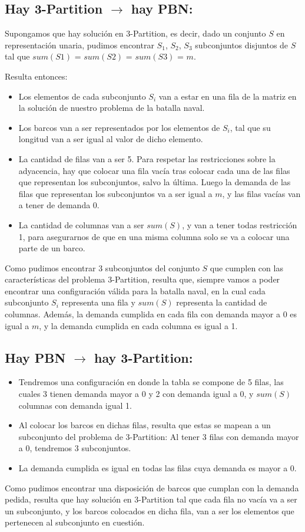 \subsection{Hay 3-Partition $\rightarrow$ hay PBN:}

Supongamos que hay solución en 3-Partition, es decir, dado un conjunto $S$ en representación unaria, pudimos
encontrar $S_1$, $S_2$, $S_3$ subconjuntos disjuntos de $S$ tal que $sum(S1)$ = $sum(S2)$ = $sum(S3)$ = $m$.

Resulta entonces: 

\begin{itemize}
    \item Los elementos de cada subconjunto $S_i$ van a estar en una fila de la matriz en la solución de nuestro problema de la batalla naval.
    \item Los barcos van a ser representados por los elementos de $S_i$, tal que su longitud van a ser igual al valor de dicho elemento.
    \item La cantidad de filas van a ser 5. Para respetar las restricciones sobre la adyacencia, hay que colocar una fila vacía tras colocar cada una de las filas que representan los subconjuntos, salvo la última. Luego la demanda de las filas que representan los subconjuntos va a ser igual a $m$, y las filas vacías van a tener de demanda 0.
    \item La cantidad de columnas van a ser $sum(S)$, y van a tener todas restricción 1, para asegurarnos de que en una misma columna solo se va a colocar una parte de un barco.
\end{itemize}
Como pudimos encontrar 3 subconjuntos del conjunto $S$ que cumplen con las características del problema 3-Partition, resulta que, siempre vamos a poder encontrar una configuración válida para la batalla naval, en la cual cada subconjunto $S_i$ representa una fila y $sum(S)$ representa la cantidad de columnas. Además, la demanda cumplida en cada fila con demanda mayor a 0 es igual a $m$, y la demanda cumplida en cada columna es igual a 1.
    
\subsection{Hay PBN $\rightarrow$ hay 3-Partition:}

\begin{itemize}
    \item Tendremos una configuración en donde la tabla se compone de 5 filas, las cuales 3 tienen demanda mayor a 0 y 2 con demanda igual a 0, y $sum(S)$ columnas con demanda igual 1.
    \item Al colocar los barcos en dichas filas, resulta que estas se mapean a un subconjunto del problema de 3-Partition: Al tener 3 filas con demanda mayor a 0, tendremos 3 subconjuntos.
    \item La demanda cumplida es igual en todas las filas cuya demanda es mayor a 0.
\end{itemize}
Como pudimos encontrar una disposición de barcos que cumplan con la demanda pedida, resulta que hay solución en 3-Partition tal que cada fila no vacía va a ser un subconjunto, y los barcos colocados en dicha fila, van a ser los elementos que pertenecen al subconjunto en cuestión.

